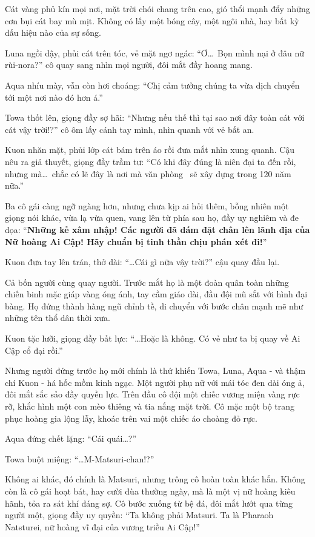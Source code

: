\documentclass[../main.tex]{subfiles}
\begin{document}
Cát vàng phủ kín mọi nơi, mặt trời chói chang trên cao, gió thổi mạnh đẩy những cơn bụi cát bay mù mịt. Không có lấy một bóng cây, một ngôi nhà, hay bất kỳ dấu hiệu nào của sự sống.


Luna ngồi dậy, phủi cát trên tóc, vẻ mặt ngơ ngác: ``Ơ\dots\ Bọn mình nại ở đâu nữ rùi-nora?'' cô quay sang nhìn mọi người, đôi mắt đầy hoang mang.

Aqua nhíu mày, vẫn còn hơi choáng: ``Chị cảm tưởng chúng ta vừa dịch chuyển tới một nơi nào đó hơn á.''

Towa thốt lên, giọng đầy sợ hãi: ``Nhưng nếu thế thì tại sao nơi đây toàn cát với cát vậy trời!?'' cô ôm lấy cánh tay mình, nhìn quanh với vẻ bất an.

Kuon nhăn mặt, phủi lớp cát bám trên áo rồi đưa mắt nhìn xung quanh. Cậu nêu ra giả thuyết, giọng đầy trầm tư: ``Có khi đây đúng là niên đại ta đến rồi, nhưng mà\dots\ chắc có lẽ đây là nơi mà văn phòng \hll\ sẽ xây dựng trong 120 năm nữa.''

Ba cô gái càng ngỡ ngàng hơn, nhưng chưa kịp ai hỏi thêm, bỗng nhiên một giọng nói khác, vừa lạ vừa quen, vang lên từ phía sau họ, đầy uy nghiêm và đe dọa: ``\textbf{Những kẻ xâm nhập! Các người đã dám đặt chân lên lãnh địa của Nữ hoàng Ai Cập! Hãy chuẩn bị tinh thần chịu phán xét đi!}''

Kuon đưa tay lên trán, thở dài: ``\dots Cái gì nữa vậy trời?'' cậu quay đầu lại.

Cả bốn người cùng quay người. Trước mắt họ là một đoàn quân toàn những chiến binh mặc giáp vàng óng ánh, tay cầm giáo dài, đầu đội mũ sắt với hình đại bàng. Họ đứng thành hàng ngũ chỉnh tề, di chuyển với bước chân mạnh mẽ như những tên thổ dân thời xưa.

Kuon tặc lưỡi, giọng đầy bất lực: ``\dots Hoặc là không. Có vẻ như ta bị quay về Ai Cập cổ đại rồi.''

Nhưng người đứng trước họ mới chính là thứ khiến Towa, Luna, Aqua - và thậm chí Kuon - há hốc mồm kinh ngạc. Một người phụ nữ với mái tóc đen dài óng ả, đôi mắt sắc sảo đầy quyền lực. Trên đầu cô đội một chiếc vương miện vàng rực rỡ, khắc hình một con mèo thiêng và tia nắng mặt trời. Cô mặc một bộ trang phục hoàng gia lộng lẫy, khoác trên vai một chiếc áo choàng đỏ rực.

Aqua đứng chết lặng: ``Cái quái\dots?''

Towa buột miệng: ``\dots M-Matsuri-chan!?''

Không ai khác, đó chính là Matsuri, nhưng trông cô hoàn toàn khác hẳn. Không còn là cô gái hoạt bát, hay cười đùa thường ngày, mà là một vị nữ hoàng kiêu hãnh, tỏa ra sát khí đáng sợ. Cô bước xuống từ bệ đá, đôi mắt lướt qua từng người một, giọng đầy uy quyền: ``Ta không phải Matsuri. Ta là Pharaoh Natsturei, nữ hoàng vĩ đại của vương triều Ai Cập!''
\end{document}
